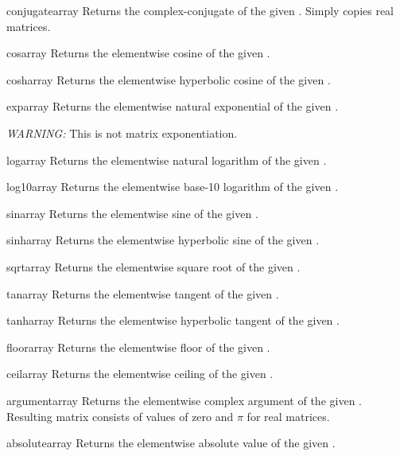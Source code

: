 \begin{funcdesc}{conjugate}{array}
  Returns the complex-conjugate of the given . Simply
  copies real matrices.
\end{funcdesc}
\begin{funcdesc}{cos}{array}
  Returns the elementwise cosine of the given .
\end{funcdesc}
\begin{funcdesc}{cosh}{array}
  Returns the elementwise hyperbolic cosine of the given
  .
\end{funcdesc}
\begin{funcdesc}{exp}{array}
  Returns the elementwise natural exponential of the given
  . 

  \emph{WARNING:} This is not matrix exponentiation.
\end{funcdesc}
\begin{funcdesc}{log}{array}
  Returns the elementwise natural logarithm of the given
  .
\end{funcdesc}
\begin{funcdesc}{log10}{array}
  Returns the elementwise base-10 logarithm of the given
  .
\end{funcdesc}
\begin{funcdesc}{sin}{array}
  Returns the elementwise sine of the given .
\end{funcdesc}
\begin{funcdesc}{sinh}{array}
  Returns the elementwise hyperbolic sine of the given .
\end{funcdesc}
\begin{funcdesc}{sqrt}{array}
  Returns the elementwise square root of the given .
\end{funcdesc}
\begin{funcdesc}{tan}{array}
  Returns the elementwise tangent of the given .
\end{funcdesc}
\begin{funcdesc}{tanh}{array}
  Returns the elementwise hyperbolic tangent of the given .
\end{funcdesc}
\begin{funcdesc}{floor}{array}
  Returns the elementwise floor of the given .
\end{funcdesc}
\begin{funcdesc}{ceil}{array}
  Returns the elementwise ceiling of the given .
\end{funcdesc}
\begin{funcdesc}{argument}{array}
  Returns the elementwise complex argument of the given .
  Resulting matrix consists of values of zero and $\pi$ for real matrices.
\end{funcdesc}
\begin{funcdesc}{absolute}{array}
  Returns the elementwise absolute value of the given .
\end{funcdesc}

